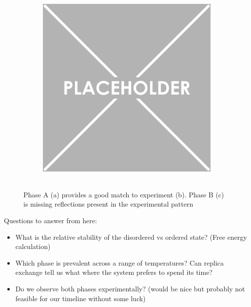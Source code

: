 \documentclass{article}
\begin{document}
\begin{figure}
\begin{subfigure}{.3\textwidth}
		\caption{~\label{fig:xrdexp}}
	\end{subfigure}
        \begin{subfigure}{.3\textwidth}
                \centering
                \includegraphics[width=\linewidth]{placeholder.png}
                \caption{~\label{fig:xrdB}}
        \end{subfigure}
	\caption{Phase A (a) provides a good match to experiment (b). Phase B (c) is missing reflections present in the experimental pattern}
	\label{fig:xrd}
	\end{figure}


	Questions to answer from here:
	\begin{itemize}
		\item What is the relative stability of the disordered vs ordered state? (Free energy calculation)
		\item Which phase is prevalent across a range of temperatures? Can replica exchange tell us what where the system prefers to spend its time?
		\item Do we observe both phases experimentally? (would be nice but probably not feasible for our timeline without some luck)
	\end{itemize}
\end{document}
